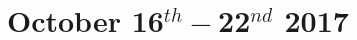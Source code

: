 \documentclass[11pt, oneside]{article}   	%
\begin{document}
\section{October 16$^{th} - $22$^{nd}$ 2017}

 
\newpage

\titleformat{\section}{\normalfont\large\bfseries}{\thesection}{1em}{}
\let\oldaddcontentsline\addcontentsline%
\renewcommand{\addcontentsline}[3]{}%

 


\let\addcontentsline\oldaddcontentsline%
\end{document}
